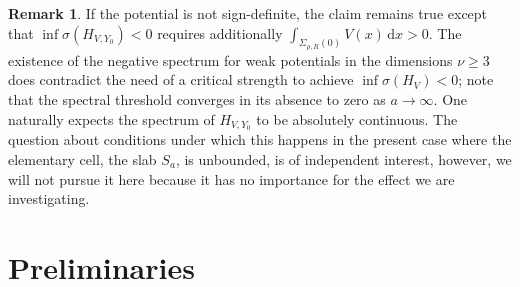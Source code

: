 \documentclass{article}
\numberwithin{equation}{section}
\theoremstyle{definition}
\newtheorem{remark}[theorem]{Remark}
\newcommand{\D}{\mathrm{d}}
\begin{document}
 \begin{remark} \label{rem:critical}
If the potential is not sign-definite, the claim remains true except that $\inf\sigma(H_{V,Y_0})<0$ requires additionally $\int_{\Sigma_{\rho,R}(0)} V(x)\,\D x>0$. The existence of the negative spectrum for weak potentials in the dimensions \mbox{$\nu\ge 3$} does contradict the need of a critical strength to achieve \mbox{$\inf\sigma(H_V)<0$;} note that the spectral threshold converges in its absence to zero as $a\to\infty$. One naturally expects the spectrum of $H_{V,Y_0}$ to be absolutely continuous. The question about conditions under which this happens in the present case where the elementary cell, the slab $S_a$, is unbounded, is of independent interest, however, we will not pursue it here because it has no importance for the effect we are investigating.
 \end{remark}

\section{Preliminaries}
\label{s:prelim}
\end{document}

